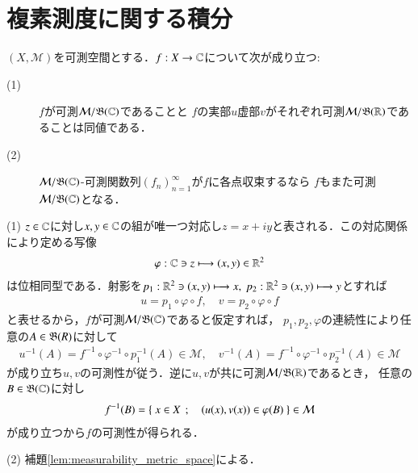 \section{複素測度に関する積分}
	\begin{screen}
		\begin{thm}[複素数値関数の可測性]
			$(X,\mathcal{M})$を可測空間とする．$f:X \rightarrow \mathbb{C}$について次が成り立つ:
			\begin{description}
				\item[(1)] $f$が可測$\mathcal{M}/\mathfrak{B}(\mathbb{C})$であることと
					$f$の実部$u$虚部$v$がそれぞれ可測$\mathcal{M}/\mathfrak{B}(\mathbb{R})$であることは同値である．
					
				\item[(2)] $\mathcal{M}/\mathfrak{B}(\mathbb{C})$-可測関数列$(f_n)_{n=1}^{\infty}$が$f$に各点収束するなら
					$f$もまた可測$\mathcal{M}/\mathfrak{B}(\mathbb{C})$となる．
			\end{description}
			\label{thm:measurability_of_complex_measurable_functions}
		\end{thm}
	\end{screen}
	
	\begin{prf}\mbox{}
		\item[(1)] $z \in \mathbb{C}$に対し$x,y \in \mathbb{C}$の組が唯一つ対応し$z = x + i y$と表される．この対応関係により定める写像
			\begin{align}
				\varphi:\mathbb{C} \ni z \longmapsto (x,y) \in \mathbb{R}^2
			\end{align}
			は位相同型である．射影を$p_1:\mathbb{R}^2 \ni (x,y) \longmapsto x,
			\ p_2:\mathbb{R}^2 \ni (x,y) \longmapsto y$とすれば
			\begin{align}
				u = p_1 \circ \varphi \circ f,
				\quad v = p_2 \circ \varphi \circ f
			\end{align}
			と表せるから，$f$が可測$\mathcal{M}/\mathfrak{B}(\mathbb{C})$であると仮定すれば，
			$p_1,p_2,\varphi$の連続性により任意の$A \in \mathfrak{B}(R)$に対して
			\begin{align}
				u^{-1}(A) = f^{-1} \circ \varphi^{-1} \circ p_1^{-1}(A) \in \mathcal{M},
				\quad v^{-1}(A) = f^{-1} \circ \varphi^{-1} \circ p_2^{-1}(A) \in \mathcal{M}
			\end{align}
			が成り立ち$u,v$の可測性が従う．逆に$u,v$が共に可測$\mathcal{M}/\mathfrak{B}(\mathbb{R})$であるとき，
			任意の$B \in \mathfrak{B}(\mathbb{C})$に対し
			\begin{align}
				f^{-1}(B) = \left\{\ x \in X\ \, ; \quad (u(x),v(x)) \in \varphi(B)\ \right\} \in \mathcal{M}
			\end{align}
			が成り立つから$f$の可測性が得られる．
		
		\item[(2)] 補題\ref{lem:measurability_metric_space}による．
			\QED
	\end{prf}
	
